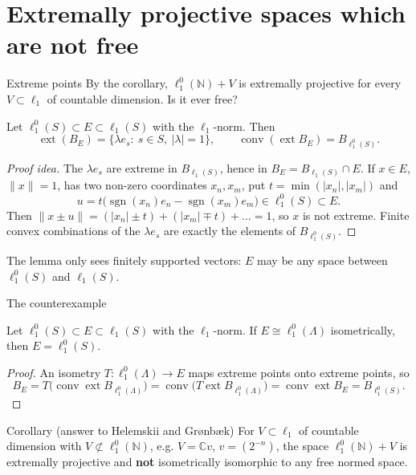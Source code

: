 \documentclass[10pt,aspectratio=169]{beamer}
\newcommand{\lo}[1]{\ell_1^0(#1)}
\newcommand{\ellone}[1]{\ell_1(#1)}
\newcommand{\ext}{\operatorname{ext}}
\newcommand{\conv}{\operatorname{conv}}
\newcommand{\NN}{\mathbb N}
\newcommand{\CC}{\mathbb C}
\begin{document}
\section{Extremally projective spaces which are not free}

\begin{frame}{Extreme points}
  By the corollary, $\lo\NN+V$ is extremally projective for every
  $V\subset\ell_1$ of countable dimension. Is it ever free?
  \begin{lemma}
    Let $\lo S\subset E\subset\ellone S$ with the $\ell_1$-norm. Then
    \[
      \ext(B_E)=\{\lambda e_s:\ s\in S,\ |\lambda|=1\},\qquad
      \conv(\ext B_E)=B_{\lo S}.
    \]
  \end{lemma}
  \begin{proof}[Proof idea]
    The $\lambda e_s$ are extreme in $B_{\ellone S}$, hence in $B_E=B_{\ellone S}\cap E$.
    If $x\in E$, $\|x\|=1$, has two non-zero coordinates $x_n,x_m$, put
    $t=\min(|x_n|,|x_m|)$ and
    \[
      u=t\bigl(\operatorname{sgn}(x_n)e_n-\operatorname{sgn}(x_m)e_m\bigr)\in\lo S\subset E .
    \]
    Then $\|x\pm u\|=(|x_n|\pm t)+(|x_m|\mp t)+\dots=1$, so $x$ is not extreme.
    Finite convex combinations of the $\lambda e_s$ are exactly the elements of
    $B_{\lo S}$.
  \end{proof}
  The lemma only sees finitely supported vectors: $E$ may be any space
  between $\lo S$ and $\ellone S$.
\end{frame}

\begin{frame}{The counterexample}
  \begin{theorem}
    Let $\lo S\subset E\subset\ellone S$ with the $\ell_1$-norm. If
    $E\cong\lo\Lambda$ isometrically, then $E=\lo S$.
  \end{theorem}
  \begin{proof}
    An isometry $T\colon\lo\Lambda\to E$ maps extreme points onto extreme points, so
    \[
      B_E=T\bigl(\conv\ext B_{\lo\Lambda}\bigr)=\conv\bigl(T\ext B_{\lo\Lambda}\bigr)
      =\conv\ext B_E=B_{\lo S}.
    \]
  \end{proof}
  \begin{alertblock}{Corollary (answer to Helemskii and Gr{\o}nb{\ae}k)}
    For $V\subset\ell_1$ of countable dimension with $V\not\subset\lo\NN$,
    e.g. $V=\CC v$, $v=(2^{-n})$, the space $\lo\NN+V$ is extremally projective
    and \textbf{not} isometrically isomorphic to any free normed space.
  \end{alertblock}
\end{frame}
\end{document}
